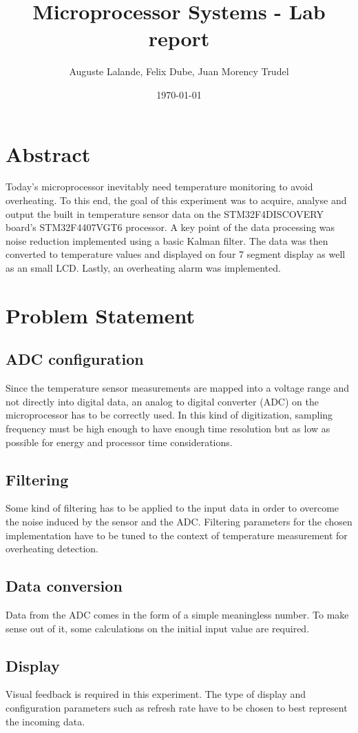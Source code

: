 \documentclass[12pt]{article}
\title{Microprocessor Systems - Lab report}
\author{Auguste Lalande, Felix Dube, Juan Morency Trudel}
\date{\today}
\begin{document}
\maketitle
\clearpage

\tableofcontents
\clearpage

\section{Abstract}
Today's microprocessor inevitably need temperature monitoring to avoid overheating. To this end, the goal of this experiment was to acquire, analyse and output the built in temperature sensor data on the STM32F4DISCOVERY board's STM32F4407VGT6 processor. A key point of the data processing was noise reduction implemented using a basic Kalman filter. The data was then converted to temperature values and displayed on four 7 segment display as well as an small LCD. Lastly, an overheating alarm was implemented.

\section{Problem Statement}
\subsection{ADC configuration} Since the temperature sensor measurements are mapped into a voltage range and not directly into digital data, an analog to digital converter (ADC) on the microprocessor has to be correctly used. In this kind of digitization, sampling frequency must be high enough to have enough time resolution but as low as possible for energy and processor time considerations.
\subsection{Filtering}
Some kind of filtering has to be applied to the input data in order to overcome the noise induced by the sensor and the ADC. Filtering parameters for the chosen implementation have to be tuned to the context of temperature measurement for overheating detection.
\subsection{Data conversion}
Data from the ADC comes in the form of a simple meaningless number. To make sense out of it, some calculations on the initial input value are required.
\subsection{Display}
Visual feedback is required in this experiment. The type of display and configuration parameters such as refresh rate have to be chosen to best represent the incoming data.
\end{document}
